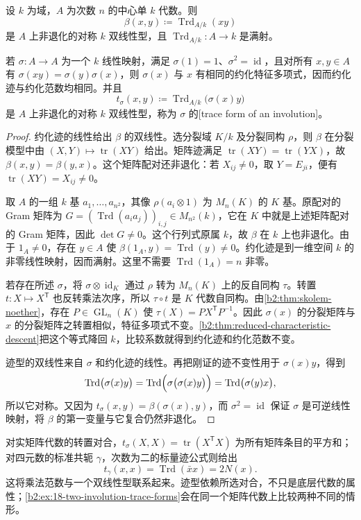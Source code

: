 \begin{proposition}\label{b2:prop:involution-reduced-trace-form}
	设 \(k\) 为域，\(A\) 为次数 \(n\) 的中心单 \(k\) 代数。则
	\[
		\beta(x,y)\coloneqq\operatorname{Trd}_{A/k}(xy)
	\]
	是 \(A\) 上非退化的对称 \(k\) 双线性型，且 \(\operatorname{Trd}_{A/k}:A\to k\) 是满射。

	若 \(\sigma:A\to A\) 为一个 \(k\) 线性映射，满足 \(\sigma(1)=1\)、\(\sigma^2=\operatorname{id}\)，且对所有 \(x,y\in A\) 有 \(\sigma(xy)=\sigma(y)\sigma(x)\)，则 \(\sigma(x)\) 与 \(x\) 有相同的约化特征多项式，因而约化迹与约化范数均相同。并且
	\[
		t_\sigma(x,y)\coloneqq\operatorname{Trd}_{A/k}\bigl(\sigma(x)y\bigr)
	\]
	是 \(A\) 上非退化的对称 \(k\) 双线性型，称为 \(\sigma\) 的[trace form of an involution]。
\end{proposition}
\begin{proof}
	约化迹的线性给出 \(\beta\) 的双线性。选分裂域 \(K/k\) 及分裂同构 \(\rho\)，则 \(\beta\) 在分裂模型中由 \((X,Y)\mapsto\operatorname{tr}(XY)\) 给出。矩阵迹满足 \(\operatorname{tr}(XY)=\operatorname{tr}(YX)\)，故 \(\beta(x,y)=\beta(y,x)\)。这个矩阵配对还非退化：若 \(X_{ij}\ne0\)，取 \(Y=E_{ji}\)，便有 \(\operatorname{tr}(XY)=X_{ij}\ne0\)。

	取 \(A\) 的一组 \(k\) 基 \(a_1,\ldots,a_{n^2}\)，其像 \(\rho(a_i\otimes1)\) 为 \(M_n(K)\) 的 \(K\) 基。原配对的 Gram 矩阵为 \(G=(\operatorname{Trd}(a_i a_j))_{i,j}\in M_{n^2}(k)\)，它在 \(K\) 中就是上述矩阵配对的 Gram 矩阵，因此 \(\det G\ne0\)。这个行列式原属 \(k\)，故 \(\beta\) 在 \(k\) 上也非退化。由于 \(1_A\ne0\)，存在 \(y\in A\) 使 \(\beta(1_A,y)=\operatorname{Trd}(y)\ne0\)。约化迹是到一维空间 \(k\) 的非零线性映射，因而满射。这里不需要 \(\operatorname{Trd}(1_A)=n\) 非零。

	若存在所述 \(\sigma\)，将 \(\sigma\otimes\operatorname{id}_K\) 通过 \(\rho\) 转为 \(M_n(K)\) 上的反自同构 \(\tau\)。转置 \(t:X\mapsto X^{\mathsf T}\) 也反转乘法次序，所以 \(\tau\circ t\) 是 \(K\) 代数自同构。由\cref{b2:thm:skolem-noether}，存在 \(P\in\operatorname{GL}_n(K)\) 使 \(\tau(X)=PX^{\mathsf T}P^{-1}\)。因此 \(\sigma(x)\) 的分裂矩阵与 \(x\) 的分裂矩阵之转置相似，特征多项式不变。\cref{b2:thm:reduced-characteristic-descent}把这个等式降回 \(k\)，比较系数就得到约化迹和约化范数不变。

	迹型的双线性来自 \(\sigma\) 和约化迹的线性。再把刚证的迹不变性用于 \(\sigma(x)y\)，得到
	\[
		\operatorname{Trd}\bigl(\sigma(x)y\bigr) =\operatorname{Trd}\Bigl(\sigma\bigl(\sigma(x)y\bigr)\Bigr) =\operatorname{Trd}\bigl(\sigma(y)x\bigr),
	\]
	所以它对称。又因为 \(t_\sigma(x,y)=\beta(\sigma(x),y)\)，而 \(\sigma^2=\operatorname{id}\) 保证 \(\sigma\) 是可逆线性映射，将 \(\beta\) 的第一变量与它复合仍然非退化。
\end{proof}

对实矩阵代数的转置对合，\(t_\sigma(X,X)=\operatorname{tr}(X^{\mathsf T}X)\) 为所有矩阵条目的平方和；对四元数的标准共轭 \(\gamma\)，次数为二的标量迹公式则给出
\[
	t_\gamma(x,x)=\operatorname{Trd}(\bar x x)=2N(x).
\]
这将乘法范数与一个双线性型联系起来。迹型依赖所选对合，不只是底层代数的属性；\cref{b2:ex:18-two-involution-trace-forms}会在同一个矩阵代数上比较两种不同的情形。
